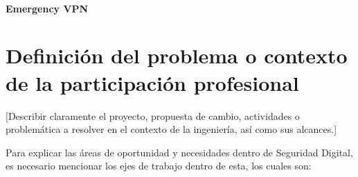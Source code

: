 \documentclass[12pt]{caltech_thesis}
\begin{document}
\subsubsection{Emergency VPN}





\chapter{Definición del problema o contexto de la participación profesional}

[Describir claramente el proyecto, propuesta de cambio, actividades o problemática a resolver en el contexto de la ingeniería, así como sus alcances.]

Para explicar las áreas de oportunidad y necesidades dentro de Seguridad Digital, es necesario mencionar los ejes de trabajo dentro de esta, los cuales son:
\end{document}
